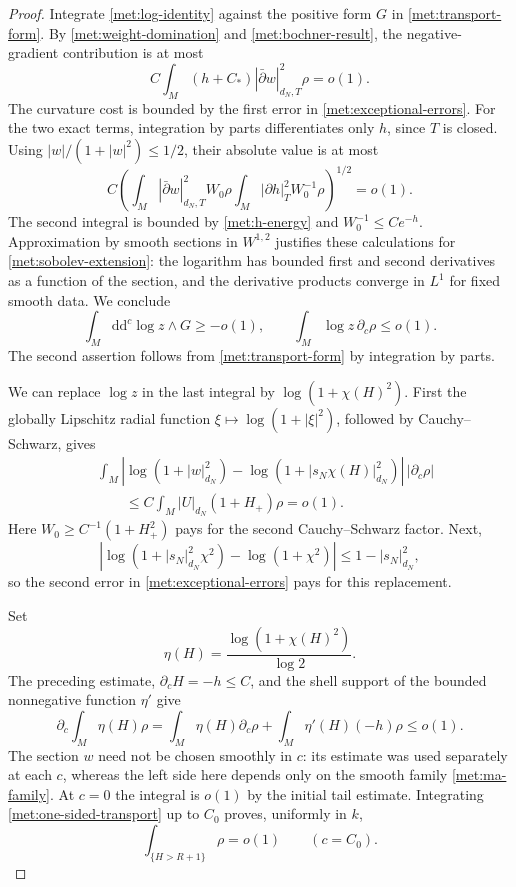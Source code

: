 \documentclass[11pt,letterpaper]{article}
\newcommand{\ddc}{\mathrm{d}\mathrm{d}^{c}}
\theoremstyle{definition}
\theoremstyle{remark}
\begin{document}
\begin{proof}
Integrate \eqref{met:log-identity} against the positive form \(G\)
in \eqref{met:transport-form}.  By
\eqref{met:weight-domination} and \eqref{met:bochner-result}, the
negative-gradient contribution is at most
\[
 C\int_M(h+C_*)|\bar\partial w|_{d_N,T}^2\rho=o(1).
\]
The curvature cost is bounded by the first error in
\eqref{met:exceptional-errors}.  For the two exact terms, integration
by parts differentiates only \(h\), since \(T\) is closed.  Using
\(|w|/(1+|w|^2)\leq1/2\), their absolute value is at most
\begin{equation}
 \label{met:log-exact-errors}
 C\left(
   \int_M|\bar\partial w|_{d_N,T}^2W_0\rho
   \int_M|\partial h|_T^2W_0^{-1}\rho
       \right)^{1/2}=o(1).
\end{equation}
The second integral is bounded by \eqref{met:h-energy} and
\(W_0^{-1}\leq C e^{-h}\).  Approximation by smooth sections in
\(W^{1,2}\) justifies these calculations for
\eqref{met:sobolev-extension}: the logarithm has bounded first and
second derivatives as a function of the section, and the derivative
products converge in \(L^1\) for fixed smooth data.  We conclude
\begin{equation}
 \label{met:log-integral}
 \int_M\ddc\log z\wedge G\geq-o(1),
 \qquad
 \int_M\log z\,\partial_c\rho\leq o(1).
\end{equation}
The second assertion follows from \eqref{met:transport-form} by
integration by parts.

We can replace \(\log z\) in the last integral by
\(\log(1+\chi(H)^2)\).  First the globally Lipschitz radial function
\(\xi\mapsto\log(1+|\xi|^2)\), followed by Cauchy--Schwarz, gives
\begin{align*}
 &\int_M\left|
 \log(1+|w|_{d_N}^2)
 -\log(1+|s_N\chi(H)|_{d_N}^2)\right|\,|\partial_c\rho|\\
 &\hspace{2em}\leq
 C\int_M|U|_{d_N}(1+H_+)\rho=o(1).
\end{align*}
Here \(W_0\geq C^{-1}(1+H_+^2)\) pays for the second
Cauchy--Schwarz factor.  Next,
\[
 \left|\log(1+|s_N|_{d_N}^2\chi^2)-\log(1+\chi^2)\right|
 \leq1-|s_N|_{d_N}^2,
\]
so the second error in \eqref{met:exceptional-errors} pays for this
replacement.

Set
\[
 \eta(H)=\frac{\log(1+\chi(H)^2)}{\log2}.
\]
The preceding estimate, \(\partial_cH=-h\leq C\), and the shell
support of the bounded nonnegative function \(\eta'\) give
\begin{equation}
 \label{met:one-sided-transport}
 \partial_c\int_M\eta(H)\rho
 =\int_M\eta(H)\partial_c\rho
       +\int_M\eta'(H)(-h)\rho
 \leq o(1).
\end{equation}
The section \(w\) need not be chosen smoothly in \(c\): its estimate
was used separately at each \(c\), whereas the left side here
depends only on the smooth family \eqref{met:ma-family}.
At \(c=0\) the integral is \(o(1)\) by the initial tail estimate.
Integrating \eqref{met:one-sided-transport} up to \(C_0\) proves,
uniformly in \(k\),
\begin{equation}
 \label{met:endpoint-tail}
 \int_{\{H>R+1\}}\rho=o(1)
 \qquad(c=C_0).
\end{equation}


\end{proof}
\end{document}
